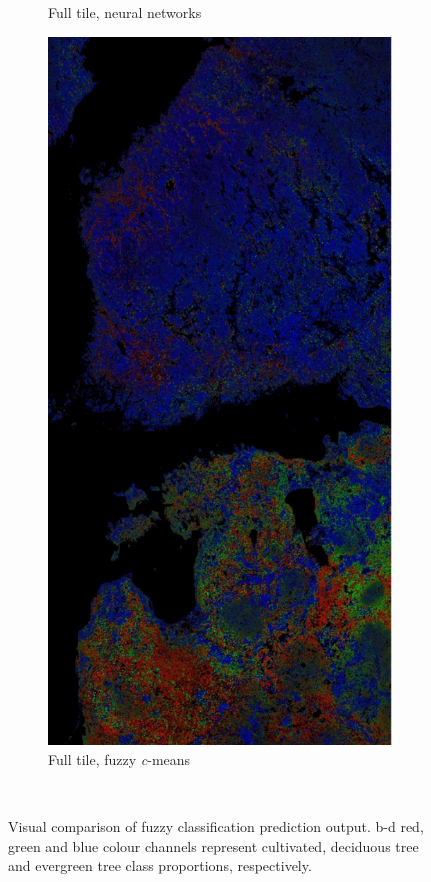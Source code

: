 \documentclass[a4paper,12pt]{scrbook}
\begin{document}
\begin{figure}
\begin{subfigure}[t]{.23\textwidth}
    \caption{Full tile, neural networks}
  \end{subfigure} \hfill
  \begin{subfigure}[t]{.23\textwidth}
    \includegraphics[width=\textwidth]{thesis-figures/figures-qgis/fulltile-cm}
    \caption{Full tile, fuzzy \textit{c}-means}
    \label{subfig-fulltile-cm}
  \end{subfigure} \
  \caption{Visual comparison of fuzzy classification prediction output. b-d red, green and blue colour channels represent cultivated, deciduous tree and evergreen tree class proportions, respectively.}
\end{figure}
\end{document}
